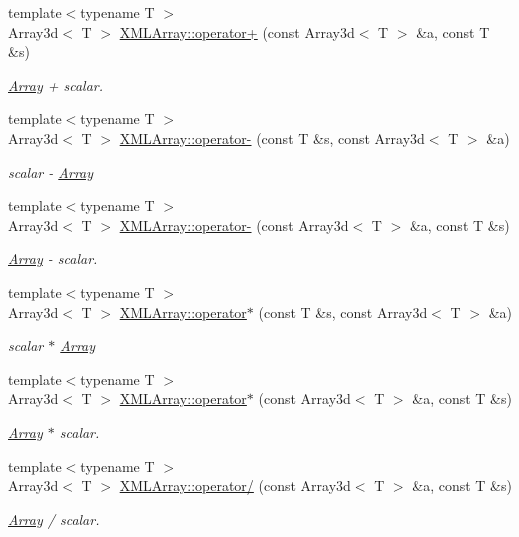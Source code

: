 \begin{DoxyCompactItemize}
{\footnotesize template$<$typename T $>$ }\\Array3d$<$ T $>$ \mbox{\hyperlink{namespaceXMLArray_ab4d92c674c66f7fcce8e97c5c9a2a665}{X\+M\+L\+Array\+::operator+}} (const Array3d$<$ T $>$ \&a, const T \&s)
\begin{DoxyCompactList}\small\item\em \mbox{\hyperlink{classXMLArray_1_1Array}{Array}} + scalar. \end{DoxyCompactList}\item 
{\footnotesize template$<$typename T $>$ }\\Array3d$<$ T $>$ \mbox{\hyperlink{namespaceXMLArray_afa891f2c8719af6106397c0e160656a3}{X\+M\+L\+Array\+::operator-\/}} (const T \&s, const Array3d$<$ T $>$ \&a)
\begin{DoxyCompactList}\small\item\em scalar -\/ \mbox{\hyperlink{classXMLArray_1_1Array}{Array}} \end{DoxyCompactList}\item 
{\footnotesize template$<$typename T $>$ }\\Array3d$<$ T $>$ \mbox{\hyperlink{namespaceXMLArray_a87b6f705aa4d225a13f5d6857be44459}{X\+M\+L\+Array\+::operator-\/}} (const Array3d$<$ T $>$ \&a, const T \&s)
\begin{DoxyCompactList}\small\item\em \mbox{\hyperlink{classXMLArray_1_1Array}{Array}} -\/ scalar. \end{DoxyCompactList}\item 
{\footnotesize template$<$typename T $>$ }\\Array3d$<$ T $>$ \mbox{\hyperlink{namespaceXMLArray_a09c6c9bdce753a6c7ccd4efbdda02e23}{X\+M\+L\+Array\+::operator$\ast$}} (const T \&s, const Array3d$<$ T $>$ \&a)
\begin{DoxyCompactList}\small\item\em scalar $\ast$ \mbox{\hyperlink{classXMLArray_1_1Array}{Array}} \end{DoxyCompactList}\item 
{\footnotesize template$<$typename T $>$ }\\Array3d$<$ T $>$ \mbox{\hyperlink{namespaceXMLArray_a6e9dd6864853158f18b5f406e398c570}{X\+M\+L\+Array\+::operator$\ast$}} (const Array3d$<$ T $>$ \&a, const T \&s)
\begin{DoxyCompactList}\small\item\em \mbox{\hyperlink{classXMLArray_1_1Array}{Array}} $\ast$ scalar. \end{DoxyCompactList}\item 
{\footnotesize template$<$typename T $>$ }\\Array3d$<$ T $>$ \mbox{\hyperlink{namespaceXMLArray_af90bb7d526be91f27f5ae1bdf5bd5a44}{X\+M\+L\+Array\+::operator/}} (const Array3d$<$ T $>$ \&a, const T \&s)
\begin{DoxyCompactList}\small\item\em \mbox{\hyperlink{classXMLArray_1_1Array}{Array}} / scalar. \end{DoxyCompactList}\end{DoxyCompactItemize}
